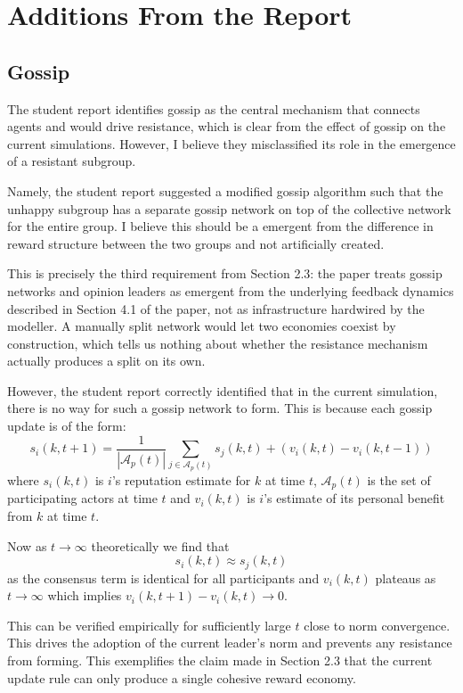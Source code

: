 \documentclass[12pt]{article}
\begin{document}
\section{Additions From the Report}
\subsection{Gossip}
The student report identifies gossip as the central mechanism that connects agents and would drive resistance,
which is clear from the effect of gossip on the current simulations.
However, I believe they misclassified its role in the emergence of a resistant subgroup.

Namely, the student report suggested a modified gossip algorithm such that the unhappy subgroup
has a separate gossip network on top of the collective network for the entire group.
I believe this should be a emergent from the difference in reward structure between the two groups and not artificially created.

This is precisely the third requirement from Section 2.3: the paper treats gossip networks and opinion leaders
as emergent from the underlying feedback dynamics described in Section 4.1 of the paper,
not as infrastructure hardwired by the modeller. A manually split network would let two economies
coexist by construction, which tells us nothing about whether the resistance mechanism actually produces a split on its own.

However, the student report correctly identified that in the current simulation, there is no way for such a gossip network to form.
This is because each gossip update is of the form:
\[ s_i(k, t+1) = \frac{1}{|\mathcal A_p(t)|}\sum_{j \in \mathcal A_p(t)}s_j(k, t) + (v_i(k, t) - v_i(k, t - 1)) \]
where $s_i(k, t)$ is $i$'s reputation estimate for $k$ at time $t$, $\mathcal A_p(t)$ is the set of participating actors
at time $t$ and $v_i(k, t)$ is $i$'s estimate of its personal benefit from $k$ at time $t$.

Now as $t \to \infty$ theoretically we find that
\[ s_i(k, t) \approx s_j(k, t) \]
as the consensus term is identical for all participants and $v_i(k, t)$ plateaus as $t \to \infty$
which implies $v_i(k, t + 1) - v_i(k, t) \to 0$.

This can be verified empirically for sufficiently large $t$ close to norm convergence. This drives
the adoption of the current leader's norm and prevents any resistance from forming.
This exemplifies the claim made in Section 2.3 that the current update rule can only produce a single cohesive reward economy.
\end{document}
